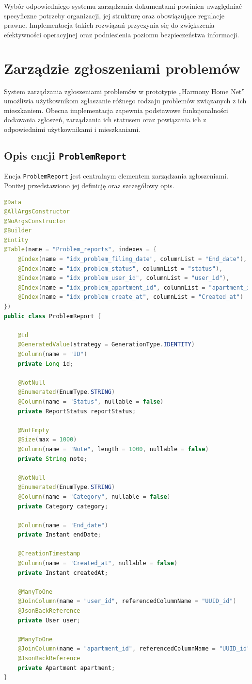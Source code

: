 Wybór odpowiedniego systemu zarządzania dokumentami powinien uwzględniać specyficzne potrzeby organizacji, jej strukturę oraz obowiązujące regulacje prawne. Implementacja takich rozwiązań przyczynia się do zwiększenia efektywności operacyjnej oraz podniesienia poziomu bezpieczeństwa informacji.

\section{Zarządzie zgłoszeniami problemów}

System zarządzania zgłoszeniami problemów w prototypie „Harmony Home Net” umożliwia użytkownikom zgłaszanie różnego rodzaju problemów związanych z ich mieszkaniem. Obecna implementacja zapewnia podstawowe funkcjonalności dodawania zgłoszeń, zarządzania ich statusem oraz powiązania ich z odpowiednimi użytkownikami i mieszkaniami.

\subsection{Opis encji \texttt{ProblemReport}}

Encja \texttt{ProblemReport} jest centralnym elementem zarządzania zgłoszeniami. Poniżej przedstawiono jej definicję oraz szczegółowy opis.

\begin{lstlisting}[language=Java, caption=Definicja encji \texttt{ProblemReport}]
@Data
@AllArgsConstructor
@NoArgsConstructor
@Builder
@Entity
@Table(name = "Problem_reports", indexes = {
    @Index(name = "idx_problem_filing_date", columnList = "End_date"),
    @Index(name = "idx_problem_status", columnList = "status"),
    @Index(name = "idx_problem_user_id", columnList = "user_id"),
    @Index(name = "idx_problem_apartment_id", columnList = "apartment_id"),
    @Index(name = "idx_problem_create_at", columnList = "Created_at")
})
public class ProblemReport {

    @Id
    @GeneratedValue(strategy = GenerationType.IDENTITY)
    @Column(name = "ID")
    private Long id;

    @NotNull
    @Enumerated(EnumType.STRING)
    @Column(name = "Status", nullable = false)
    private ReportStatus reportStatus;

    @NotEmpty
    @Size(max = 1000)
    @Column(name = "Note", length = 1000, nullable = false)
    private String note;

    @NotNull
    @Enumerated(EnumType.STRING)
    @Column(name = "Category", nullable = false)
    private Category category;

    @Column(name = "End_date")
    private Instant endDate;

    @CreationTimestamp
    @Column(name = "Created_at", nullable = false)
    private Instant createdAt;

    @ManyToOne
    @JoinColumn(name = "user_id", referencedColumnName = "UUID_id")
    @JsonBackReference
    private User user;

    @ManyToOne
    @JoinColumn(name = "apartment_id", referencedColumnName = "UUID_id")
    @JsonBackReference
    private Apartment apartment;
}
\end{lstlisting}

